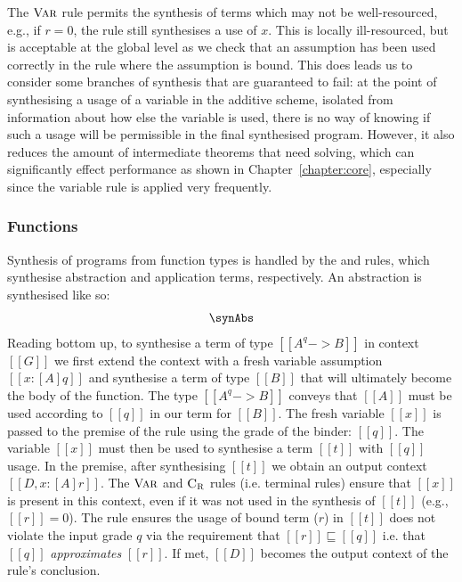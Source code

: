 The $\textsc{Var}$ rule permits the synthesis of terms which may not
be well-resourced, e.g., if $r = 0$, the rule still synthesises a use of
$x$. This is locally ill-resourced, but is acceptable at the global
level as we check that an assumption has been used correctly in the rule where the assumption is bound. This does leads us to consider some branches of synthesis
that are guaranteed to fail: at the point of synthesising a usage of a
variable in the additive scheme, isolated from information about how
else the variable is used, there is no way of knowing if such a usage
will be permissible in the final synthesised program. However, it also
reduces the amount of intermediate theorems that need solving, which
can significantly effect performance as shown
in Chapter~\ref{chapter:core}, especially since the variable
rule is applied very frequently.

\subsubsection{Functions}

Synthesis of programs from function types is handled by the \GRANULEdruleAbsName and
\GRANULEdruleAppName rules, which synthesise abstraction and application terms,
respectively. An abstraction is synthesised like so:
\begin{align*}
    \synAbs
\end{align*}
%
Reading bottom up, to synthesise a term of type $[[ A ^ q -> B ]]$ in context
$[[ G ]]$ we first extend the context with a fresh variable assumption $[[ x :
[A] q ]]$ and synthesise a term of type $[[ B ]]$ that will ultimately become
the body of the function. The type $[[ A ^ q -> B ]]$ conveys that $[[ A ]]$
must be used according to $[[ q ]]$ in our term for $[[ B ]]$. The fresh
variable $[[ x ]]$  is passed to the premise of the rule using the grade of the
binder: $[[ q ]]$. The variable $[[ x ]]$ must then be used to synthesise a term
$[[ t ]]$ with $[[ q ]]$ usage. In the premise, after synthesising $[[ t ]]$ we
obtain an output context $[[ D, x : [A] r ]]$. The $\textsc{Var}$ and
$\textsc{C}_\textsc{R}$ rules (i.e. terminal rules) ensure that $[[ x ]]$ is
present in this context, even if it was not used in the synthesis of $[[ t ]]$
(e.g., $[[ r ]] = 0$). The rule ensures the usage of bound term ($r$) in $[[t]]$
does not violate the input grade $q$ via the requirement that $[[ r ]]
\sqsubseteq [[ q ]]$ i.e. that $[[ q ]]$ \textit{approximates} $[[ r ]]$. If
met, $[[ D ]]$ becomes the output context of the rule's conclusion.

